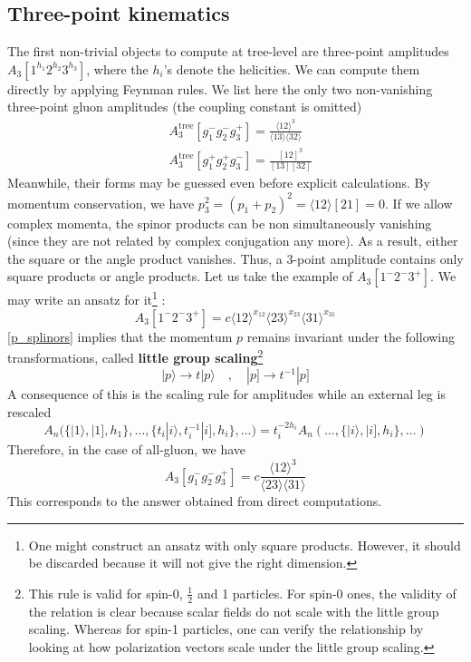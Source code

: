\subsection*{Three-point kinematics}
The first non-trivial objects to compute at tree-level are three-point amplitudes $A_3[1^{h_1}2^{h_2}3^{h_3}]$, where the $h_i$'s denote the helicities.
We can compute them directly by applying Feynman rules. 
We list here the only two non-vanishing three-point gluon amplitudes (the coupling constant is omitted)
\begin{equation}\label{a3mhv}
\begin{split}
& A^{\mathrm{tree}}_3[g_1^- g_2^- g_3^+] = \frac{\langle 12 \rangle^3}{\langle 13 \rangle \langle 32 \rangle}
\\
& A^{\mathrm{tree}}_3[g_1^+ g_2^+ g_3^-] = \frac{ [12]^3}{[13 ][ 32 ]}
\end{split}
\end{equation}
Meanwhile, their forms may be guessed even before explicit calculations.  
By momentum conservation, we have $p_3^2 = (p_1 + p_2)^2 = \langle 12\rangle[21] = 0$. 
If we allow complex momenta, the spinor products can be non simultaneously vanishing (since they are not related by complex conjugation any more). 
As a result, either the square or the angle product vanishes.
Thus, a 3-point amplitude contains only square products or angle products. 
Let us take the example of $A_3[1^{-}2^{-}3^{+}]$.
We may write an ansatz for it\footnote{One might construct an ansatz with only square products. However, it should be discarded because it will not give the right dimension.} :
\begin{equation}
A_3[1^{-}2^{-}3^{+}] = c\langle 12 \rangle^{x_{12}}\langle 23 \rangle^{x_{23}}\langle 31 \rangle^{x_{31}}
\end{equation}
\cref{p_splinors} implies that the momentum $p$ remains invariant under the following transformations, called \textbf{little group scaling}\footnote{This rule is valid for spin-0, $\frac{1}{2}$ and 1 particles. 
For spin-0 ones, the validity of the relation is clear because scalar fields do not scale with the little group scaling.
Whereas for spin-1 particles, one can verify the relationship by looking at how polarization vectors scale under the little group scaling.
}
\begin{equation}
|p\rangle \rightarrow t| p\rangle \quad,\quad 
|p]\rightarrow t^{-1} |p]
\end{equation} 
A consequence of this is the scaling rule for amplitudes while an external leg is rescaled
\begin{equation}
A_n \big(\{ |1\rangle, |1], h_1\},\ldots,\{t_i|i\rangle, t_i^{-1}|i], h_i\},\ldots\big) = 
t_i^{-2h_i}A_n(\ldots, \{|i\rangle,|i], h_i\},\ldots)
\end{equation}
Therefore, in the case of all-gluon, we have
\begin{equation}
A_3[g_1^-g_2^-g_3^+] = c\frac{\langle 12\rangle^3}{\langle 23 \rangle\langle 31\rangle}
\end{equation}
This corresponds to the answer obtained from direct computations.
%
%
